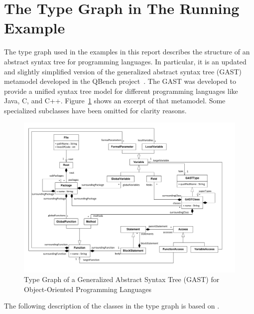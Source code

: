 \section{The Type Graph in The Running Example}
\label{sec:typeGraph}

The type graph used in the examples in this report describes the structure of an abstract syntax tree for programming languages.
In particular, it is an updated and slightly simplified version of the generalized abstract syntax tree (GAST) metamodel developed in the QBench project~\cite{QBench}.
The GAST was developed to provide a unified syntax tree model for different programming languages like Java, C, and C++.
Figure~\ref{fig:gast-mm} shows an excerpt of that metamodel.
Some specialized subclasses have been omitted for clarity reasons.

\begin{figure}[htbp]
  \centering
  \includegraphics[width=\linewidth]{figures/gast-mm}
  \caption{Type Graph of a Generalized Abstract Syntax Tree (GAST) for Object-Oriented Programming Languages \cite{QBench}}
  \label{fig:gast-mm}
\end{figure}

The following description of the classes in the type graph is based on \cite{Tra11}.

